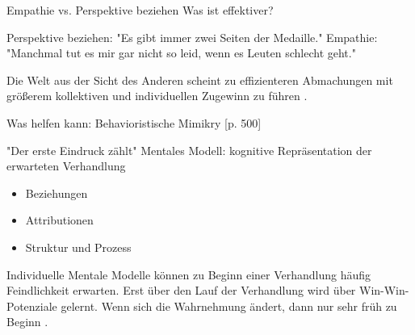 \begin{frame}{Empathie vs. Perspektive beziehen} %
  Was ist effektiver?

  Perspektive beziehen: "Es gibt immer zwei Seiten der Medaille."
  Empathie: "Manchmal tut es mir gar nicht so leid, wenn es Leuten schlecht geht."

  Die Welt aus der Sicht des Anderen scheint zu effizienteren Abmachungen mit größerem kollektiven und individuellen Zugewinn zu führen \cite{galinsky_why_2008}.

  
  Was helfen kann: Behavioristische Mimikry \cite{thompson_negotiation_2010}[p. 500]
\end{frame}

\begin{frame}{"Der erste Eindruck zählt"}
  Mentales Modell: kognitive Repräsentation der erwarteten Verhandlung \cite[][p. 287ff]{bazerman_negotiation_2000}
  \begin{itemize}
	\item Beziehungen
	\item Attributionen
	\item Struktur und Prozess
  \end{itemize}
  
	  Individuelle Mentale Modelle können zu Beginn einer Verhandlung häufig Feindlichkeit erwarten.
      Erst über den Lauf der Verhandlung wird über Win-Win-Potenziale gelernt. Wenn sich die Wahrnehmung ändert, dann nur sehr früh zu Beginn \cite{thompson_social_1990}
	  \cite[][p. 287ff]{bazerman_negotiation_2000}. 

\end{frame}



